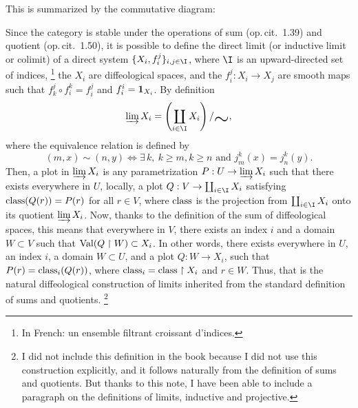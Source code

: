 This is summarized by the commutative diagram:

\begin{center}
\end{center}

Since the category  is stable under the operations of sum (op.\,cit. \textsection\,1.39) and quotient (op.\,cit. \textsection\,1.50),
it is possible to define the direct limit (or inductive limit or colimit) of a direct system $\{X_i,f_i^j\}_{i,j \in \I}$,
where $\I$ is an upward-directed set of indices,%
\footnote{In French: un ensemble filtrant croissant d'indices.}
the $X_i$ are diffeological spaces,
and the $f_i^j : X_i \to X_j$ are smooth maps such that $f_k^j \circ f_i^k = f_i^j$ and $f_i^i = {\mathbf{1}}_{X_i}$.
By definition
$$
  \varinjlim X_i = \left(\coprod_{i \in \I} X_i\right) / \raisebox{-5pt}{\scalebox{2}[2]{$\sim$}},
  $$
where the equivalence relation is defined by
$$
  (m,x) \sim (n,y) \Leftrightarrow \exists\, k,\ k \geq m,
  k \geq n \mbox{ and } j_m^k(x) = j_n^k(y).
  $$
Then,
a plot in $\varinjlim X_i$ is any parametrization $P : U \to \varinjlim X_i$ such that there exists everywhere in $U$,
locally,
a plot $Q : V \to \coprod_{i \in \I} X_i$ satisfying $\operatorname{class}(Q(r)) = P(r)$ for all $r \in V$,
where $\operatorname{class}$ is the projection from $\coprod_{i \in \I} X_i$ onto its quotient $\varinjlim X_i$.
Now,
thanks to the definition of the sum of diffeological spaces,
this means that everywhere in $V$,
there exists an index $i$ and a domain $W \subset V$ such that $\operatorname{Val}(Q \restriction W) \subset X_i$.
In other words,
there exists everywhere in $U$,
an index $i$,
a domain $W \subset U$,
and a plot $Q : W \to X_i$,
such that $P(r) = \operatorname{class}_i(Q(r))$,
where $\operatorname{class}_i = \operatorname{class} \restriction X_i$ and $r \in W$.
Thus,
that is the natural diffeological construction of limits inherited from the standard definition of sums and quotients.%
\footnote{I did not include this definition in the book because I did not use this construction explicitly,
and it follows naturally from the definition of sums and quotients.
But thanks to this note,
I have been able to include a paragraph on the definitions of limits,
inductive and projective.}

